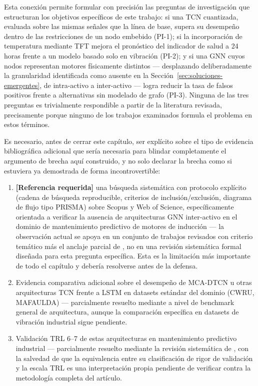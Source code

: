 \documentclass[11pt]{article}
\begin{document}
Esta conexión permite formular con precisión las preguntas de investigación que estructuran los objetivos específicos de este trabajo: si una TCN cuantizada, evaluada sobre las mismas señales que la línea de base, supera su desempeño dentro de las restricciones de un nodo embebido (PI-1); si la incorporación de temperatura mediante TFT mejora el pronóstico del indicador de salud a 24 horas frente a un modelo basado solo en vibración (PI-2); y si una GNN cuyos nodos representan motores físicamente distintos --- desplazando deliberadamente la granularidad identificada como ausente en la Sección~\ref{sec:soluciones-emergentes}, de intra-activo a inter-activo --- logra reducir la tasa de falsos positivos frente a alternativas sin modelado de grafo (PI-3). Ninguna de las tres preguntas es trivialmente respondible a partir de la literatura revisada, precisamente porque ninguno de los trabajos examinados formula el problema en estos términos.

Es necesario, antes de cerrar este capítulo, ser explícito sobre el tipo de evidencia bibliográfica adicional que sería necesaria para blindar completamente el argumento de brecha aquí construido, y no solo declarar la brecha como si estuviera ya demostrada de forma incontrovertible:

\begin{enumerate}
\item \textbf{[Referencia requerida]} una búsqueda sistemática con protocolo explícito (cadena de búsqueda reproducible, criterios de inclusión/exclusión, diagrama de flujo tipo PRISMA) sobre Scopus y Web of Science, específicamente orientada a verificar la ausencia de arquitecturas GNN inter-activo en el dominio de mantenimiento predictivo de motores de inducción --- la observación actual se apoya en un conjunto de trabajos revisados con criterio temático más el anclaje parcial de \citet{li2022gnnbenchmark}, no en una revisión sistemática formal diseñada para esta pregunta específica. Esta es la limitación más importante de todo el capítulo y debería resolverse antes de la defensa.
\item Evidencia comparativa adicional sobre el desempeño de MCA-DTCN u otras arquitecturas TCN frente a LSTM en datasets estándar del dominio (CWRU, MAFAULDA) --- parcialmente resuelto mediante \citet{bai2018tcn} a nivel de benchmark general de arquitectura, aunque la comparación específica en datasets de vibración industrial sigue pendiente.
\item Validación TRL 6--7 de estas arquitecturas en mantenimiento predictivo industrial --- parcialmente resuelto mediante la revisión sistemática de \citet{henaovilla2026}, con la salvedad de que la equivalencia entre su clasificación de rigor de validación y la escala TRL es una interpretación propia pendiente de verificar contra la metodología completa del artículo.
\end{enumerate}
\end{document}
